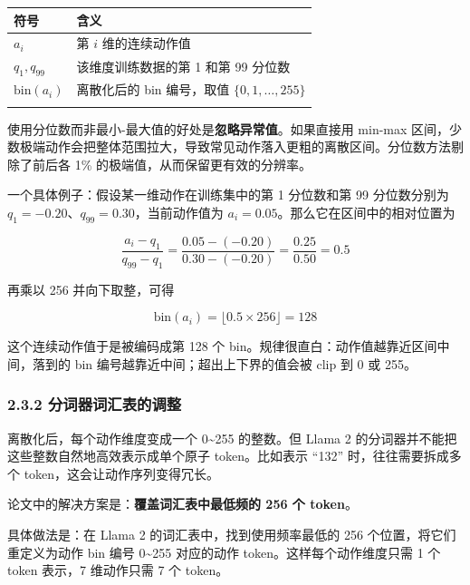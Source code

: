\documentclass[
  chinese,
]{ctexart}
\begin{document}
\begin{center}
\begin{tabular}{@{}>{\raggedright\arraybackslash}p{} >{\raggedright\arraybackslash}p{}@{}}
\toprule\noalign{}
符号 & 含义 \\
\midrule\noalign{}
\(a_i\) & 第 \(i\) 维的连续动作值 \\
\(q_1, q_{99}\) & 该维度训练数据的第 1 和第 99 分位数 \\
\(\text{bin}(a_i)\) & 离散化后的 bin 编号，取值 \(\{0, 1, \ldots, 255\}\) \\
\bottomrule\noalign{}
\end{tabular}
\end{center}

使用分位数而非最小-最大值的好处是\textbf{忽略异常值}。如果直接用 min-max
区间，少数极端动作会把整体范围拉大，导致常见动作落入更粗的离散区间。分位数方法剔除了前后各
1\% 的极端值，从而保留更有效的分辨率。

一个具体例子：假设某一维动作在训练集中的第 1 分位数和第 99 分位数分别为
\(q_1=-0.20\)、\(q_{99}=0.30\)，当前动作值为
\(a_i=0.05\)。那么它在区间中的相对位置为

\[
\frac{a_i-q_1}{q_{99}-q_1} = \frac{0.05-(-0.20)}{0.30-(-0.20)} = \frac{0.25}{0.50} = 0.5
\]

再乘以 256 并向下取整，可得

\[
\text{bin}(a_i)=\lfloor 0.5 \times 256 \rfloor = 128
\]

这个连续动作值于是被编码成第 128 个
bin。规律很直白：动作值越靠近区间中间，落到的 bin
编号越靠近中间；超出上下界的值会被 clip 到 0 或 255。

\subsubsection{2.3.2
分词器词汇表的调整}\label{ux5206ux8bcdux5668ux8bcdux6c47ux8868ux7684ux8c03ux6574}

离散化后，每个动作维度变成一个 0\textasciitilde255 的整数。但 Llama 2
的分词器并不能把这些整数自然地高效表示成单个原子 token。比如表示 ``132''
时，往往需要拆成多个 token，这会让动作序列变得冗长。

论文中的解决方案是：\textbf{覆盖词汇表中最低频的 256 个 token}。

具体做法是：在 Llama 2 的词汇表中，找到使用频率最低的 256
个位置，将它们重定义为动作 bin 编号 0\textasciitilde255 对应的动作
token。这样每个动作维度只需 1 个 token 表示，7 维动作只需 7 个 token。
\end{document}

